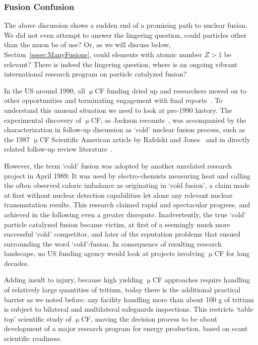 \documentclass[particles,article,accept,pdftex,moreauthors]{Definitions/mdpi}
\begin{document}
\subsubsection{Fusion Confusion}\label{ssec:conCF}
The above discussion shows a sudden end of a promising path to nuclear fusion. We did not even attempt to answer the lingering question, could particles other than the muon be of use? Or, as we will discuss below, Section~\ref{sssec:ManyFusions}, could elements with atomic number $Z>1$ be relevant? There is indeed the lingering question, where is an ongoing vibrant international research program on particle catalyzed fusion? 

In the US around 1990, all $\upmu$CF funding dried up and researchers moved on to other opportunities and terminating engagement with final reports~\cite{Rafelski:1991DOE}. To understand this unusual situation we need to look at pre-1990 history. The experimental discovery of $\upmu$CF, as Jackson recounts~\cite{Jackson:2010Rem}, was accompanied by the characterization in follow-up discussion as `cold' nuclear fusion process, such as the 1987 $\upmu$CF Scientific American article by Rafelski and Jones~\cite{Rafelski:1987Jones} and in directly related follow-up review literature~\cite{Rafelski:1990gg}.

However, the term `cold' fusion was adopted by another unrelated research project in April 1989: It was used by electro-chemists measuring heat and calling the often observed caloric imbalance as originating in `cold fusion', a claim made at first without nuclear detection capabilities let alone any relevant nuclear transmutation results. This research claimed rapid and spectacular progress, and achieved in the following even a greater disrepute. Inadvertently, the true `cold' particle catalyzed fusion became victim, at first of a seemingly much more successful `cold' competitor, and later of the reputation problems that ensued surrounding the word `cold'-fusion. In consequence of resulting research landscape, no US funding agency would look at projects involving $\upmu$CF for long decades.

Adding insult to injury, because high yielding $\upmu$CF approaches require handling of relatively large quantities of tritium, today there is the additional practical barrier as we noted before: any facility handling more than about 100 g of tritium is subject to bilateral and multilateral safeguards inspections. This restricts `table top' scientific study of $\upmu$CF, moving the decision process to be about development of a major research program for energy production, based on scant scientific readiness.
\end{document}
